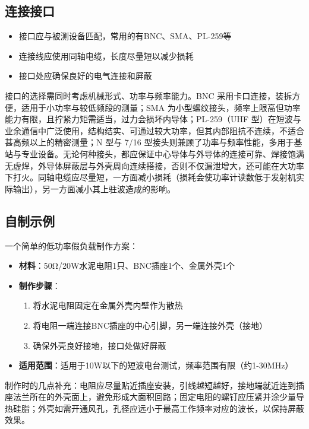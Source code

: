\subsection{连接接口}

\begin{itemize}
    \item 接口应与被测设备匹配，常用的有BNC、SMA、PL-259等
    \item 连接线应使用同轴电缆，长度尽量短以减少损耗
    \item 接口处应确保良好的电气连接和屏蔽
\end{itemize}

接口的选择需同时考虑机械形式、功率与频率能力。BNC 采用卡口连接，装拆方便，适用于小功率与较低频段的测量；SMA 为小型螺纹接头，频率上限高但功率能力有限，且拧紧力矩需适当，过力会损坏内导体；PL-259（UHF 型）在短波与业余通信中广泛使用，结构结实、可通过较大功率，但其内部阻抗不连续，不适合甚高频以上的精密测量；N 型与 7/16 型接头则兼顾了功率与频率性能，多用于基站与专业设备。无论何种接头，都应保证中心导体与外导体的连接可靠、焊接饱满无虚焊，外导体屏蔽层与外壳周向连续搭接，否则不仅漏泄增大，还可能在大功率下打火。同轴电缆应尽量短，一方面减小损耗（损耗会使功率计读数低于发射机实际输出），另一方面减小其上驻波造成的影响。

\subsection{自制示例}

一个简单的低功率假负载制作方案：

\begin{itemize}
    \item \textbf{材料}：50Ω/20W水泥电阻1只、BNC插座1个、金属外壳1个
    \item \textbf{制作步骤}：
    \begin{enumerate}
        \item 将水泥电阻固定在金属外壳内壁作为散热
        \item 将电阻一端连接BNC插座的中心引脚，另一端连接外壳（接地）
        \item 确保外壳良好接地，接口处做好屏蔽
    \end{enumerate}
    \item \textbf{适用范围}：适用于10W以下的短波电台测试，频率范围有限（约1-30MHz）
\end{itemize}

制作时的几点补充：电阻应尽量贴近插座安装，引线越短越好，接地端就近连到插座法兰所在的外壳面上，避免形成大面积回路；固定电阻的螺钉应压紧并涂少量导热硅脂；外壳如需开通风孔，孔径应远小于最高工作频率对应的波长，以保持屏蔽效果。


